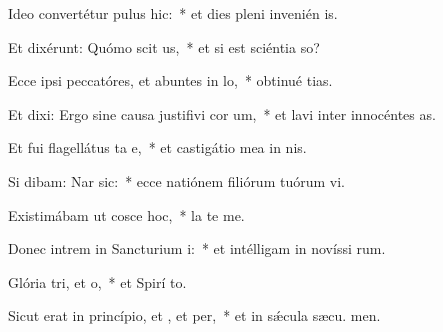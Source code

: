 \item Ideo convertétur pulus  hic:~* et dies pleni invenién  is.
\item Et dixérunt: Quómo scit us,~* et si est sciéntia  so?
\item Ecce ipsi peccatóres, et abuntes in lo,~* obtinué tias.
\item Et dixi: Ergo sine causa justifivi cor um,~* et lavi inter innocéntes  as.
\item Et fui flagellátus ta e,~* et castigátio mea in nis.
\item Si dibam: Nar sic:~* ecce natiónem filiórum tuórum vi.
\item Existimábam ut cosce hoc,~* la  te me.
\item Donec intrem in Sancturium i:~* et intélligam in novíssi rum.
\item Glória tri, et o,~* et Spirí to.
\item Sicut erat in princípio, et , et per,~* et in sǽcula sæcu. men.
